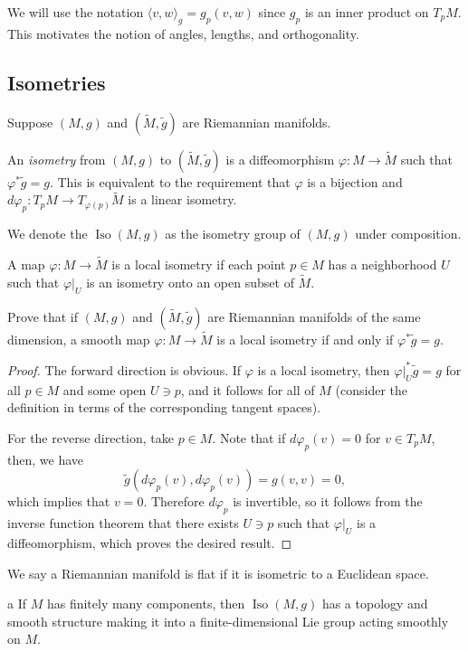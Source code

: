 \documentclass[11pt]{scrartcl}
\newcommand{\<}{\langle}
\renewcommand{\>}{\rangle}
\let \phi \varphi
\newcommand{\1}{\textbf{1}} %
\begin{document}
We will use the notation $\<v, w\>_g = g_p(v, w)$ since $g_p$ is an inner product on $T_pM$.  This motivates the notion of angles, lengths, and orthogonality.  
\subsection{Isometries}
Suppose $(M, g)$ and $(\tilde{M}, \tilde{g})$ are Riemannian manifolds.  
\begin{definition}[Isometry] An \textit{isometry} from $(M, g)$ to $(\tilde{M}, \tilde{g})$ is a diffeomorphism $\phi: M \to \tilde{M}$ such that $\phi^* \tilde{g}  = g$.  This is equivalent to the requirement that $\phi$ is a bijection and $d\phi_p: T_pM \to T_{\phi(p)}\tilde{M}$ is a linear isometry.  
\end{definition}
We denote the $\operatorname{Iso}(M, g)$ as the isometry group of $(M, g)$ under composition.  
\begin{definition} A map $\phi: M \to \tilde{M}$ is a local isometry if each point $p \in M$ has a neighborhood $U$ such that $\phi\vert_U$ is an isometry onto an open subset of $\tilde{M}$.
\end{definition}
\begin{exercise} Prove that if $(M, g)$ and $(\tilde M, \tilde g)$ are Riemannian manifolds of the same dimension, a smooth map $\phi: M \to \tilde{M}$ is a local isometry if and only if $\phi^* \tilde{g} = g$.
\end{exercise}
\begin{proof}
The forward direction is obvious.  If $\phi$ is a local isometry, then $\phi\vert_U ^*\tilde{g} = g$ for all $p \in M$ and some open $U \ni p$, and it follows for all of $M$ (consider the definition in terms of the corresponding tangent spaces).

For the reverse direction, take $p \in M$. Note that if $d\phi_p(v) = 0$ for $v \in T_pM$, then, we have 
$$\tilde{g}(d\phi_p(v), d\phi_p(v)) = g(v, v) = 0,$$
which implies that $v = 0$.  Therefore $d\phi_p$ is invertible, so it follows from the inverse function theorem that there exists $U \ni p$ such that $\phi\vert_U$ is a diffeomorphism, which proves the desired result.
\end{proof}
\begin{definition} We say a Riemannian manifold is flat if it is isometric to a Euclidean space.
\end{definition}
\begin{theorem}a If $M$ has finitely many components, then $\operatorname{Iso}(M, g)$ has a topology and smooth structure making it into a finite-dimensional Lie group acting smoothly on $M$.  
\end{theorem}
\end{document}
